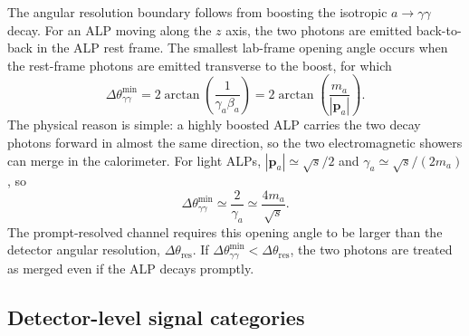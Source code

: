 \documentclass[12pt,a4paper]{article}
\begin{document}
The angular resolution boundary follows from boosting the isotropic
$a\to\gamma\gamma$ decay. For an ALP moving along the $z$ axis, the two photons
are emitted back-to-back in the ALP rest frame. The smallest lab-frame opening
angle occurs when the rest-frame photons are emitted transverse to the boost,
for which
\begin{equation}
    \Delta\theta_{\gamma\gamma}^{\min}
    =
    2\arctan\!\left(\frac{1}{\gamma_a\beta_a}\right)
    =
    2\arctan\!\left(\frac{m_{a}}{|\mathbf{p}_a|}\right).
    \label{eq:dtheta_exact}
\end{equation}
The physical reason is simple: a highly boosted ALP carries the two decay
photons forward in almost the same direction, so the two electromagnetic
showers can merge in the calorimeter. For light ALPs,
$|\mathbf{p}_a|\simeq\sqrt{s}/2$ and $\gamma_a\simeq\sqrt{s}/(2m_{a})$, so
\begin{equation}
    \Delta\theta_{\gamma\gamma}^{\min}
    \simeq
    \frac{2}{\gamma_a}
    \simeq
    \frac{4m_{a}}{\sqrt{s}}.
    \label{eq:dtheta}
\end{equation}
The prompt-resolved channel requires this opening angle to be larger than the
detector angular resolution, $\Delta\theta_\mathrm{res}$. If
$\Delta\theta_{\gamma\gamma}^{\min}<\Delta\theta_\mathrm{res}$, the two photons
are treated as merged even if the ALP decays promptly.

\subsection{Detector-level signal categories}
\end{document}
